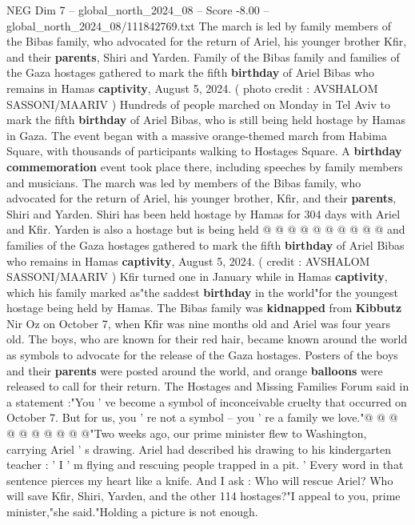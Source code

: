 \begin{textsample}{NEG Dim 7 – global\_north\_2024\_08 – Score -8.00 – global\_north\_2024\_08/111842769.txt}  \label{ex:f7_neg_084}
The march is led by family members of the Bibas family, who advocated for the return of Ariel, his younger brother Kfir, and their \textbf{parents}, Shiri and Yarden.
Family of the Bibas family and families of the Gaza hostages gathered to mark the fifth \textbf{birthday} of Ariel Bibas who remains in Hamas \textbf{captivity}, August 5, 2024. ( photo credit : AVSHALOM SASSONI/MAARIV ) Hundreds of people marched on Monday in Tel Aviv to mark the fifth \textbf{birthday} of Ariel Bibas, who is still being held hostage by Hamas in Gaza.
The event began with a massive orange-themed march from Habima Square, with thousands of participants walking to Hostages Square.
A \textbf{birthday} \textbf{commemoration} event took place there, including speeches by family members and musicians.
The march was led by members of the Bibas family, who advocated for the return of Ariel, his younger brother, Kfir, and their \textbf{parents}, Shiri and Yarden.
Shiri has been held hostage by Hamas for 304 days with Ariel and Kfir.
Yarden is also a hostage but is being held @ @ @ @ @ @ @ @ @ @ and families of the Gaza hostages gathered to mark the fifth \textbf{birthday} of Ariel Bibas who remains in Hamas \textbf{captivity}, August 5, 2024. ( credit : AVSHALOM SASSONI/MAARIV ) Kfir turned one in January while in Hamas \textbf{captivity}, which his family marked as"the saddest \textbf{birthday} in the world"for the youngest hostage being held by Hamas.
The Bibas family was \textbf{kidnapped} from \textbf{Kibbutz} Nir Oz on October 7, when Kfir was nine months old and Ariel was four years old.
The boys, who are known for their red hair, became known around the world as symbols to advocate for the release of the Gaza hostages.
Posters of the boys and their \textbf{parents} were posted around the world, and orange \textbf{balloons} were released to call for their return.
The Hostages and Missing Families Forum said in a statement :"You ' ve become a symbol of inconceivable cruelty that occurred on October 7.
But for us, you ' re not a symbol -- you ' re a family we love."@ @ @ @ @ @ @ @ @ @"Two weeks ago, our prime minister flew to Washington, carrying Ariel ' s drawing.
Ariel had described his drawing to his kindergarten teacher : ' I ' m flying and rescuing people trapped in a pit. ' Every word in that sentence pierces my heart like a knife.
And I ask : Who will rescue Ariel?
Who will save Kfir, Shiri, Yarden, and the other 114 hostages?"I appeal to you, prime minister,"she said."Holding a picture is not enough.

\end{textsample}
